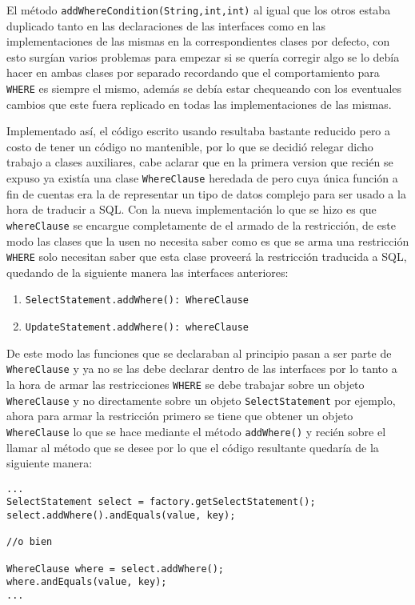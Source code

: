 El método \verb=addWhereCondition(String,int,int)= al igual que los otros estaba duplicado tanto en las declaraciones de las interfaces como en las implementaciones de las mismas en la correspondientes clases por defecto, con esto surgían varios problemas para empezar si se quería corregir algo se lo debía hacer en ambas clases por separado recordando que el comportamiento para \verb=WHERE= es siempre el mismo, además se debía estar chequeando con los eventuales cambios que este fuera replicado en todas las implementaciones de las mismas.

Implementado así, el código escrito usando \jj resultaba bastante reducido pero a costo de tener un código no mantenible, por lo que se decidió relegar dicho trabajo a clases auxiliares, cabe aclarar que en la primera version que recién se expuso ya existía una clase \verb=WhereClause= heredada de \cc pero cuya única función a fin de cuentas era la de representar un tipo de datos complejo para ser usado a la hora de traducir a SQL. Con la nueva implementación lo que se hizo es que \verb=whereClause= se encargue completamente de el armado de la restricción, de este modo las clases que la usen no necesita saber como es que se arma una restricción \verb=WHERE= solo necesitan saber que esta clase proveerá la restricción traducida a SQL, quedando de la siguiente manera las interfaces anteriores:
%
\begin{enumerate}
\item \verb=SelectStatement.addWhere(): WhereClause=
\item \verb=UpdateStatement.addWhere(): whereClause=
\end{enumerate}
%
De este modo las funciones que se declaraban al principio pasan a ser parte de  \verb=WhereClause= y ya no se las debe declarar dentro de las interfaces por lo tanto a la hora de armar las restricciones \verb=WHERE= se debe trabajar sobre un objeto \verb=WhereClause= y no directamente sobre un objeto \verb=SelectStatement= por ejemplo, ahora para armar la restricción primero se tiene que obtener un objeto \verb=WhereClause= lo que se hace mediante el método \verb=addWhere()= y recién sobre el llamar al método que se desee por lo que el código resultante quedaría de la siguiente manera:
%
\begin{lstlisting}[title=Nueva implementación para el uso de las clases auxiliares]
...
SelectStatement select = factory.getSelectStatement();
select.addWhere().andEquals(value, key);

//o bien

WhereClause where = select.addWhere();
where.andEquals(value, key);
...
\end{lstlisting}

